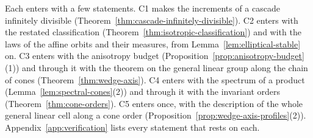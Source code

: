 Each enters with a few statements. C1 makes the increments of a cascade infinitely divisible
(Theorem~\ref{thm:cascade-infinitely-divisible}). C2 enters with the restated classification
(Theorem~\ref{thm:isotropic-classification}) and with the laws of the affine orbits and their
\Levy{} measures, from Lemma~\ref{lem:elliptical-stable} on. C3 enters with the anisotropy budget
(Proposition~\ref{prop:anisotropy-budget}(1)) and through it with the theorem on the general linear group along the chain of cones
(Theorem~\ref{thm:wedge-axis}). C4 enters with the spectrum of a product
(Lemma~\ref{lem:spectral-cones}(2)) and through it with the invariant orders
(Theorem~\ref{thm:cone-orders}). C5 enters once, with the description of the whole general linear cell
along a cone order (Proposition~\ref{prop:wedge-axis-profiles}(2)). Appendix~\ref{app:verification} lists every statement that rests on each.


